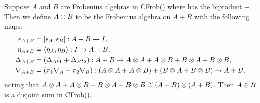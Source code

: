 \begin{proposition}\label{prop:cfrobx_has_disjoint_sums}
  Suppose $A$ and $B$ are Frobenius algebras in CFrob(\X) where
  \X has the biproduct $+$. Then we define $A\oplus B$ to be the Frobenius
  algebra on $A+B$ with the following maps:
  \begin{align*}
    \epsilon_{A+B} &\doteq [\epsilon_A,\epsilon_B]:A+B \to I,\\
    \eta_{A+B}&\doteq \langle\eta_A,\eta_B\rangle:I\to A+B,\\
    \Delta_{A+B} & \doteq (\Delta_A i_1 + \Delta_B i_2):A+B\to A\otimes A+A\otimes B+B\otimes A+B\otimes B,\\
    \nabla_{A+B} & \doteq (\pi_1 \nabla_A + \pi_2 \nabla_B): (A\otimes A+A\otimes B)+(B\otimes A+B\otimes B) \to A+B,
  \end{align*}
  noting that $A\otimes A+A\otimes B+B\otimes A+B\otimes B \cong (A+B)\otimes(A+B)$.
  Then $A\oplus B$ is a disjoint sum in CFrob(\X).
\end{proposition}
